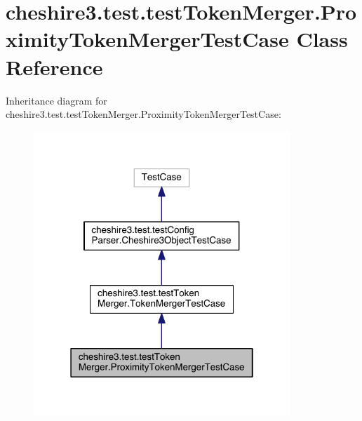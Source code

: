 \hypertarget{classcheshire3_1_1test_1_1test_token_merger_1_1_proximity_token_merger_test_case}{\section{cheshire3.\-test.\-test\-Token\-Merger.\-Proximity\-Token\-Merger\-Test\-Case Class Reference}
\label{classcheshire3_1_1test_1_1test_token_merger_1_1_proximity_token_merger_test_case}
}


Inheritance diagram for cheshire3.\-test.\-test\-Token\-Merger.\-Proximity\-Token\-Merger\-Test\-Case\-:
\nopagebreak
\begin{figure}[H]
\begin{center}
\leavevmode
\includegraphics[width=274pt]{classcheshire3_1_1test_1_1test_token_merger_1_1_proximity_token_merger_test_case__inherit__graph}
\end{center}
\end{figure}


